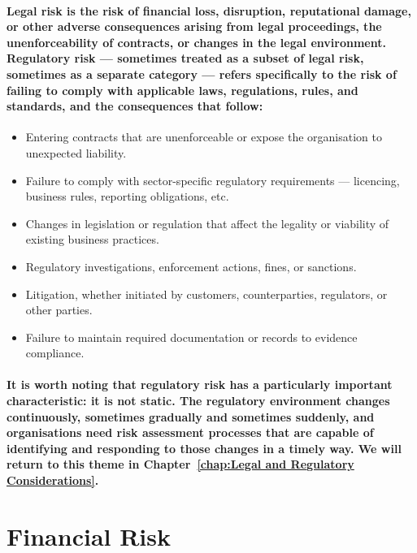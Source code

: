 \paragraph{Legal risk is the risk of financial loss, disruption, reputational damage, or other adverse consequences arising from legal proceedings, the unenforceability of contracts, or changes in the legal environment. Regulatory risk — sometimes treated as a subset of legal risk, sometimes as a separate category — refers specifically to the risk of failing to comply with applicable laws, regulations, rules, and standards, and the consequences that follow:}
\begin{itemize}
  \item{Entering contracts that are unenforceable or expose the organisation to unexpected liability.}
  \item{Failure to comply with sector-specific regulatory requirements — licencing, business rules, reporting obligations, etc.}
  \item{Changes in legislation or regulation that affect the legality or viability of existing business practices.}
  \item{Regulatory investigations, enforcement actions, fines, or sanctions.}
  \item{Litigation, whether initiated by customers, counterparties, regulators, or other parties.}
  \item{Failure to maintain required documentation or records to evidence compliance.}
\end{itemize}
\paragraph{It is worth noting that regulatory risk has a particularly important characteristic: \textbf{it is not static}. The regulatory environment changes continuously, sometimes gradually and sometimes suddenly, and organisations need risk assessment processes that are capable of identifying and responding to those changes in a timely way. We will return to this theme in Chapter~\ref{chap:Legal and Regulatory Considerations}.}

\section{Financial Risk}
